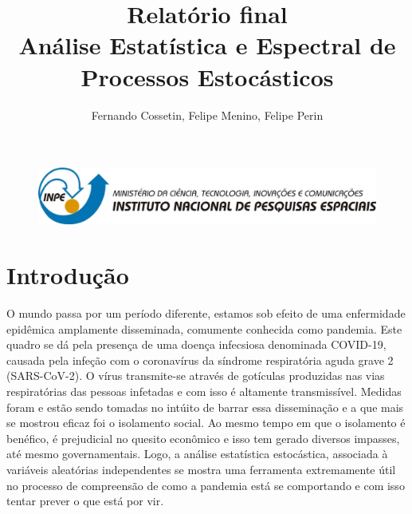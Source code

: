 \documentclass[a4paper,12pt]{article}
\begin{document}
\begin{figure}
 \begin{center}
  \includegraphics[width=1\linewidth]{fig/logoinpe.png}
 \end{center}
\end{figure}

\setlength{\textfloatsep}{0pt}

\title{Relatório final \\ Análise Estatística e Espectral de Processos Estocásticos}

\author{Fernando Cossetin, Felipe Menino, Felipe Perin}
\date{}

\maketitle

\section{Introdução}


\par O mundo passa por um período diferente, estamos sob efeito de uma enfermidade epidêmica amplamente disseminada, comumente conhecida como pandemia. Este quadro se dá pela presença de uma doença infecsiosa denominada COVID-19, causada pela infeção com o coronavírus da síndrome respiratória aguda grave 2 (SARS-CoV-2). O vírus transmite-se através de gotículas produzidas nas vias respiratórias das pessoas infetadas e com isso é altamente transmissível. Medidas foram e estão sendo tomadas no intúito de barrar essa disseminação e a que mais se mostrou eficaz foi o isolamento social. Ao mesmo tempo em que o isolamento é benéfico, é prejudicial no quesito econômico e isso tem gerado diversos impasses, até mesmo governamentais. Logo, a análise estatística estocástica, associada à variáveis aleatórias independentes se mostra uma ferramenta extremamente útil no processo de compreensão de como a pandemia está se comportando e com isso tentar prever o que está por vir.
\end{document}
